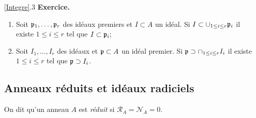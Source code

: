 \documentclass[a4paper, oneside, 12pt]{book}
\theoremstyle{theoremeStyle} %
\theoremstyle{definition} %
\begin{document}
\ref{Integre}.3 \textbf{Exercice.}\begin{enumerate}[leftmargin=* ,parsep=0cm,itemsep=0cm,topsep=0cm]
\item Soit $\frak{p}_1,\dots,\frak{p}_r$ des idéaux premiers et $I\subset A$ un idéal. Si $I\subset \cup_{1\leq i\leq r}\frak{p}_i$ il existe $1\leq i\leq r$ tel que $I\subset \frak{p}_i$;
\item Soit $I_1,\dots, I_r$ des idéaux   et $\frak{p}\subset A$ un idéal premier. Si $\frak{p}\supset \cap_{1\leq i\leq r}I_i$ il existe $1\leq i\leq r$ tel que $\frak{p}\supset I_i$.\\
\end{enumerate}





  \subsection{Anneaux réduits et idéaux radiciels}\label{Reduit} On dit qu'un anneau $A$ est \textit{réduit} si  $\mathcal{R}_A=\mathcal{N}_A=0$. \\
\end{document}
